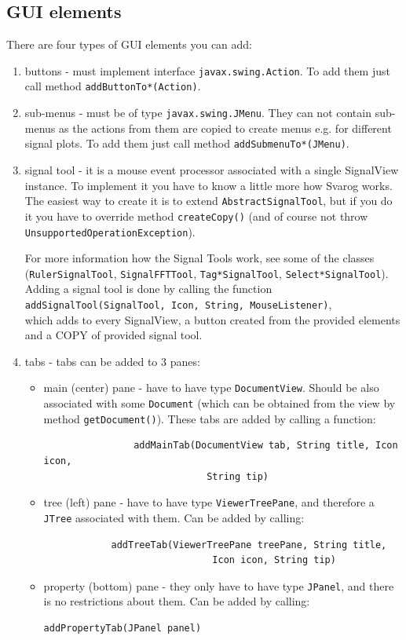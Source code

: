 \documentclass{article}
\begin{document}
\subsection{GUI elements}
\label{gui}
There are four types of GUI elements you can add:
\begin{enumerate}
	\item buttons - must implement interface \verb=javax.swing.Action=.
	To add them just call method \verb=addButtonTo*(Action)=.
	\item sub-menus - must be of type \verb=javax.swing.JMenu=.
	They can not contain sub-menus as the actions from them are copied to create menus
	e.g. for different signal plots.
	To add them just call method \verb=addSubmenuTo*(JMenu)=.
	\item signal tool - it is a mouse event processor associated with a single SignalView instance.
	To implement it you have to know a little more how Svarog works.
	The easiest way to create it is to extend \verb=AbstractSignalTool=, but if you do it you have to
	override method \verb=createCopy()= (and of course not throw \verb=UnsupportedOperationException=).
	
	For more information how the Signal Tools work, see some of the classes (\verb=RulerSignalTool=, \verb=SignalFFTTool=,
	\verb=Tag*SignalTool=, \verb=Select*SignalTool=).\\
	Adding a signal tool is done by calling the function \\
	\verb=addSignalTool(SignalTool, Icon, String, MouseListener)=,\\
	which adds to every SignalView, a button created from the provided elements and a COPY of provided signal tool.
	\item tabs - tabs can be added to 3 panes:
	\begin{itemize}
		\item main (center) pane - have to have type \verb=DocumentView=. Should be also associated with some
			\verb=Document= (which can be obtained from the view by method \verb=getDocument()=).
			These tabs are added by calling a function:
			\begin{verbatim}
				addMainTab(DocumentView tab, String title, Icon icon,
				             String tip)
			\end{verbatim}
		\item tree (left) pane - have to have type \verb=ViewerTreePane=, and therefore a \verb=JTree= associated with
			them.
			Can be added by calling:
			\begin{verbatim}
			addTreeTab(ViewerTreePane treePane, String title,
			                  Icon icon, String tip)
			\end{verbatim}
		\item property (bottom) pane - they only have to have type \verb=JPanel=, and there is no restrictions about
			them.
			Can be added by calling:
			\begin{verbatim}addPropertyTab(JPanel panel)\end{verbatim}
	\end{itemize}
\end{enumerate}
\end{document}
